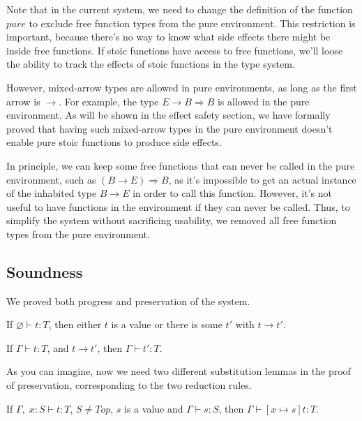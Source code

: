 Note that in the current system, we need to change the definition of
the function $pure$ to exclude free function types from the pure
environment. This restriction is important, because there's no way to
know what side effects there might be inside free functions. If stoic
functions have access to free functions, we'll loose the ability to
track the effects of stoic functions in the type system.

However, mixed-arrow types are allowed in pure environments, as long
as the first arrow is $\to$. For example, the type
$E \to B \Rightarrow B$ is allowed in the pure environment. As will be
shown in the effect safety section, we have formally proved that
having such mixed-arrow types in the pure environment doesn't enable
pure stoic functions to produce side effects.

In principle, we can keep some free functions that can never be called
in the pure environment, such as $(B \to E) \Rightarrow B$, as it's
impossible to get an actual instance of the inhabited type $B \to E$
in order to call this function. However, it's not useful to have
functions in the environment if they can never be called. Thus, to
simplify the system without sacrificing usability, we removed all free
function types from the pure environment.

\subsection{Soundness}

We proved both progress and preservation of the system.

\begin{theorem}[Progress]
If $\varnothing \vdash t : T$, then either $t$ is a value or there is some
$t'$ with $t \longrightarrow t'$.
\end{theorem}

\begin{theorem}[Preservation]
If $\Gamma \vdash t : T$, and $t \longrightarrow t'$, then $\Gamma
\vdash t' : T$.
\end{theorem}

As you can imagine, now we need two different substitution lemmas in
the proof of preservation, corresponding to the two reduction rules.

\begin{lemma}
  If $\Gamma,\; x:S \vdash t : T$, $S \neq Top$, $s$ is a value and
  $\Gamma \vdash s : S$, then $\Gamma \vdash [x \mapsto s]t : T$.
\end{lemma}

